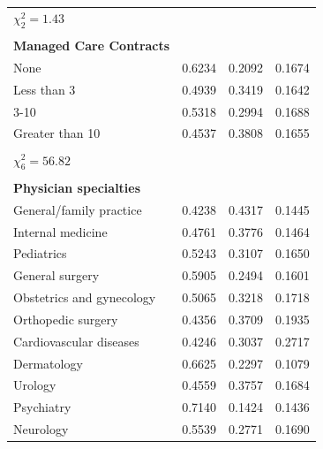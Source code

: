 \documentclass[12pt]{report}
\begin{document}
{\begin{center}
\begin{longtable}{lccc}
$\chi^2_2 = 1.43$                      &          &            &            \\
                                       &          &            &            \\
\textbf{Managed Care Contracts}        &          &            &            \\
None                                   & 0.6234   & 0.2092     & 0.1674     \\
Less than 3                            & 0.4939   & 0.3419     & 0.1642     \\
3-10                                   & 0.5318   & 0.2994     & 0.1688     \\
Greater than 10                        & 0.4537   & 0.3808     & 0.1655     \\
                                       &          &            &            \\
$\chi^2_6 = 56.82$                     &          &            &            \\
                                       &          &            &            \\
\textbf{Physician specialties}         &          &            &            \\
General/family practice                & 0.4238   & 0.4317     & 0.1445     \\
Internal medicine                      & 0.4761   & 0.3776     & 0.1464     \\
Pediatrics                             & 0.5243   & 0.3107     & 0.1650     \\
General surgery                        & 0.5905   & 0.2494     & 0.1601     \\
Obstetrics and gynecology              & 0.5065   & 0.3218     & 0.1718     \\
Orthopedic surgery                     & 0.4356   & 0.3709     & 0.1935     \\
Cardiovascular diseases                & 0.4246   & 0.3037     & 0.2717     \\
Dermatology                            & 0.6625   & 0.2297     & 0.1079     \\
Urology                                & 0.4559   & 0.3757     & 0.1684     \\
Psychiatry                             & 0.7140   & 0.1424     & 0.1436     \\
Neurology                              & 0.5539   & 0.2771     & 0.1690     \\

\end{longtable}
\end{center}}
\end{document}
